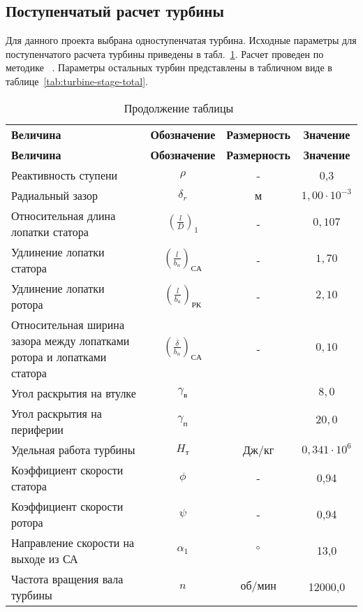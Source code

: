 \subsection{Поступенчатый расчет турбины}
Для данного проекта выбрана одноступенчатая турбина.
Исходные параметры для поступенчатого расчета турбины приведены в табл.~\ref{turbine:midline_inlet}.
Расчет проведен по методике ~\cite{gtd_theory_text_book, mikhaltsev_1, mikhaltsev_2}.
Параметры остальных турбин представлены в табличном виде в таблице~\ref{tab:turbine-stage-total}.
\begin{center}
	\begin{longtable}{|p{4cm}|c|c|c|}
		\caption{Исходные параметры поступенчатого расчета турбины}
		\label{turbine:midline_inlet}
		\endfirsthead
		\caption*{\tabcapalign Продолжение таблицы~\thetable}\\[-0.45\onelineskip]
		\hline
		\textbf{Величина} & \textbf{Обозначение} & \textbf{Размерность} & \textbf{Значение} \\ \hline
		\endhead
		\hline
		\textbf{Величина} & \textbf{Обозначение} & \textbf{Размерность} & \textbf{Значение} \\ \hline
			Реактивность ступени & $\rho$ & - & 0,3  \\ \hline
			Радиальный зазор & $\delta_r$ & м & $1,00 \cdot 10^{-3}$ \\ \hline
			Относительная длина лопатки статора & $\left( \frac{l}{D} \right)_1$ & - & $0,107$ \\ \hline
			Удлинение лопатки статора & $\left( \frac{l}{b_a} \right)_{СА}$ & - & $1,70$ \\ \hline
			Удлинение лопатки ротора & $\left( \frac{l}{b_a} \right)_{РК}$ & - & $2,10$ \\ \hline
			Относительная ширина зазора между лопатками ротора и лопатками статора & $\left( \frac{\delta}{b_a} \right)_{СА}$ & - & $0,10$ \\ \hline
			Угол раскрытия на втулке & $\gamma_{в}$ & \degree & $8,0$ \\ \hline
			Угол раскрытия на периферии & $\gamma_{п}$ & \degree & $20,0$ \\ \hline
			Удельная работа турбины & $H_т$ & Дж/кг & $0,341 \cdot 10^6$ \\ \hline
			Коэффициент скорости статора & $\phi$ & - & 0,94 \\ \hline
			Коэффициент скорости ротора & $\psi$ & - & 0,94 \\ \hline
			Направление скорости на выходе из СА & $\alpha_1$ & $\degree$ & 13,0 \\ \hline
			Частота вращения вала турбины & $n$ & $об/мин$ & 12000,0 \\ \hline
	\end{longtable}
\end{center}

